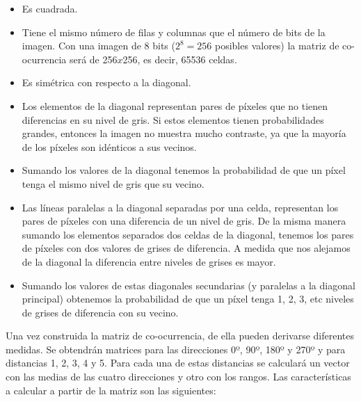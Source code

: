 \begin{itemize}

\item Es cuadrada.

\item Tiene el mismo número de filas y columnas que el número de bits de la imagen. Con una imagen de 8 bits ($2^{8} = 256$ posibles valores) la matriz de co-ocurrencia será de 256$x$256, es decir, 65536 celdas.

\item Es simétrica con respecto a la diagonal.

\item Los elementos de la diagonal representan pares de píxeles que no tienen diferencias en su nivel de gris. Si estos elementos tienen probabilidades grandes, entonces la imagen no muestra mucho contraste, ya que la mayoría de los píxeles son idénticos a sus vecinos.

\item Sumando los valores de la diagonal tenemos la probabilidad de que un píxel tenga el mismo nivel de gris que su vecino.

\item Las líneas paralelas a la diagonal separadas por una celda, representan los pares de píxeles con una diferencia de un nivel de gris. De la misma manera sumando los elementos separados dos celdas de la diagonal, tenemos los pares de píxeles con dos valores de grises de diferencia. A medida que nos alejamos de la diagonal la diferencia entre niveles de grises es mayor.

\item Sumando los valores de estas diagonales secundarias (y paralelas a la diagonal principal) obtenemos la probabilidad de que un píxel tenga 1, 2, 3, etc niveles de grises de diferencia con su vecino.

\end{itemize}

Una vez construida la matriz de co-ocurrencia, de ella pueden derivarse diferentes medidas. Se obtendrán matrices para las direcciones 0º, 90º, 180º y 270º y para distancias 1, 2, 3, 4 y 5. Para cada una de estas distancias se calculará un vector con las medias de las cuatro direcciones y otro con los rangos. Las características a calcular a partir de la matriz son las siguientes:

